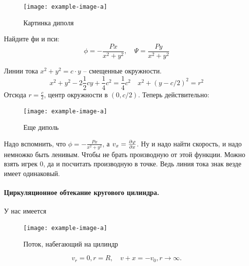 \begin{figure}[h!]
    \centering
    \texttt{[image: example-image-a]}
    \caption{Картинка диполя}
    \label{fig:figure1}
\end{figure}

Найдите фи и пси:
\begin{equation}
	\phi=-\frac{Px}{x^2+y^2}, \quad
	\Psi=\frac{Py}{x^2+y^2}
\end{equation}

Линии тока $x^2+y^2=c\cdot y$ -- смещенные окружности.
\begin{equation}
	x^2+y^2-2\frac{1}{2}cy+\frac{1}{4}c^2=\frac{1}{4}c^2 \quad
	x^2+(y-c/2)^2=r^2
\end{equation}
Отсюда $r=\frac{c}{2}$, центр окружности в $(0,c/2)$. Теперь действительно:
\begin{figure}[h!]
    \centering
    \texttt{[image: example-image-a]}
    \caption{Еще диполь}
    \label{fig:figure1}
\end{figure}

Надо вспомнить, что $\phi=-\frac{Px}{x^2+y^2}$, а $v_x=\pdv{\varphi}{x}$. Ну и надо найти скорость, и надо немножко быть ленивым. Чтобы не брать производную от этой функции. Можно взять игрек 0, да и посчитать производную в точке. Ведь линия тока знак везде имеет одинаковый.

\paragraph{Циркуляционное обтекание кругового цилиндра.} У нас имеется 
\begin{figure}[h!]
    \centering
    \texttt{[image: example-image-a]}
    \caption{Поток, набегающий на цилиндр}
    \label{fig:figure1}
\end{figure}

\begin{equation}
	v_r=0, r=R, \quad
	v+x=-v_0, r\to\infty.
\end{equation}

